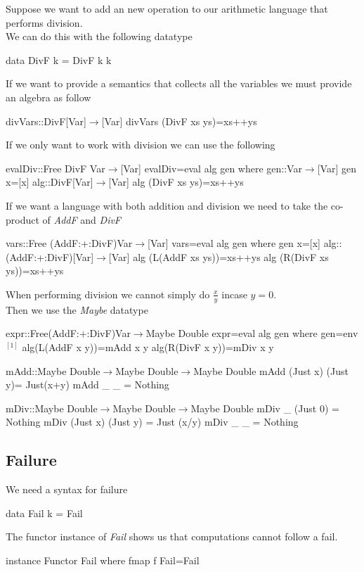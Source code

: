 \documentclass[11pt,a4paper]{article}
\begin{document}
Suppose we want to add an new operation to our arithmetic language that performs division.\\
We can do this with the following datatype
\begin{code}
data DivF k = DivF k k
\end{code}
If we want to provide a semantics that collects all the variables we must provide an algebra as follow
\begin{code}
divVars::DivF[Var]$\to$[Var]
divVars (DivF xs ys)=xs++ys
\end{code}
If we only want to work with division we can use the following
\begin{code}
evalDiv::Free DivF Var$\to$[Var]
evalDiv=eval alg gen
  where
    gen::Var$\to$[Var]
    gen x=[x]
    alg::DivF[Var]$\to$[Var]
    alg (DivF xs ys)=xs++ys
\end{code}
If we want a language with both addition and division we need to take the co-product of \textit{AddF} and \textit{DivF}
\begin{code}
vars::Free (AddF:+:DivF)Var$\to$[Var]
vars=eval alg gen
  where
    gen x=[x]
    alg::(AddF:+:DivF)[Var]$\to$[Var]
    alg (L(AddF xs ys))=xs++ys
    alg (R(DivF xs ys))=xs++ys
\end{code}
When performing division we cannot simply do $\frac{x}{y}$ incase $y=0$.\\
Then we use the \textit{Maybe} datatype
\begin{code}
expr::Free(AddF:+:DivF)Var$\to$Maybe Double
expr=eval alg gen
  where
    gen=env$^[1]$
    alg(L(AddF x y))=mAdd x y
    alg(R(DivF x y))=mDiv x y

    mAdd::Maybe Double$\to$Maybe Double$\to$Maybe Double
    mAdd (Just x) (Just y)= Just(x+y)
    mAdd _         _      = Nothing

    mDiv::Maybe Double$\to$Maybe Double$\to$Maybe Double
    mDiv _        (Just 0) = Nothing
    mDiv (Just x) (Just y) = Just (x/y)
    mDiv _        _        = Nothing
\end{code}

\subsection{Failure}

We need a syntax for failure
\begin{code}
data Fail k = Fail
\end{code}

The functor instance of \textit{Fail} shows us that computations cannot follow a fail.
\begin{code}
instance Functor Fail
  where
    fmap f Fail=Fail
\end{code}
\end{document}
